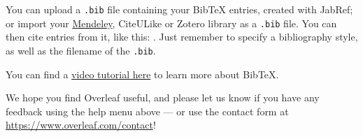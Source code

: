 You can upload a \verb|.bib| file containing your BibTeX entries, created with JabRef; or import your \href{https://www.overleaf.com/blog/184}{Mendeley}, CiteULike or Zotero library as a \verb|.bib| file. You can then cite entries from it, like this: \cite{greenwade93}. Just remember to specify a bibliography style, as well as the filename of the \verb|.bib|.

You can find a \href{https://www.overleaf.com/help/97-how-to-include-a-bibliography-using-bibtex}{video tutorial here} to learn more about BibTeX.

We hope you find Overleaf useful, and please let us know if you have any feedback using the help menu above --- or use the contact form at \url{https://www.overleaf.com/contact}!

\newpage

% 


